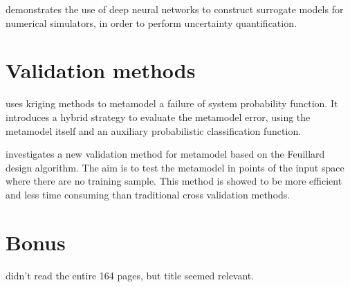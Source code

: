 \documentclass{article}
\begin{document}
    \cite{Tripathy2018DeepUL} demonstrates the use of deep neural networks to construct surrogate models for numerical simulators, in order to perform uncertainty quantification.

\section{Validation methods}

    \cite{Dubourg2011MetamodelbasedIS} uses kriging methods to metamodel a failure of system probability function. It introduces a hybrid strategy to evaluate the metamodel error, using the metamodel itself and an auxiliary probabilistic classification function.

    \cite{Iooss2009NumericalSO} investigates a new validation method for metamodel based on the Feuillard design algorithm. The aim is to test the metamodel in points of the input space where there are no training sample. This method is showed to be more efficient and less time consuming than traditional cross validation methods.


\section{Bonus}
    \cite{Grandjacques2015AnalyseDS} didn't read the entire 164 pages, but title seemed relevant.




\end{document}
